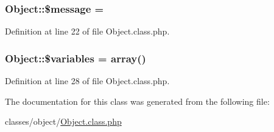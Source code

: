 \subsubsection[{\texorpdfstring{\$message}{$message}}]{\setlength{\rightskip}{0pt plus 5cm}Object\+::\$message = \textquotesingle{}}\hypertarget{classObject_af661550c62873d6b6e61f32d68c56973}{}\label{classObject_af661550c62873d6b6e61f32d68c56973}


Definition at line 22 of file Object.\+class.\+php.

\subsubsection[{\texorpdfstring{\$variables}{$variables}}]{\setlength{\rightskip}{0pt plus 5cm}Object\+::\$variables = array()}\hypertarget{classObject_a153e76f6619408780cc2b50cef5100c6}{}\label{classObject_a153e76f6619408780cc2b50cef5100c6}


Definition at line 28 of file Object.\+class.\+php.



The documentation for this class was generated from the following file\+:\begin{DoxyCompactItemize}
\item 
classes/object/\hyperlink{Object_8class_8php}{Object.\+class.\+php}\end{DoxyCompactItemize}
